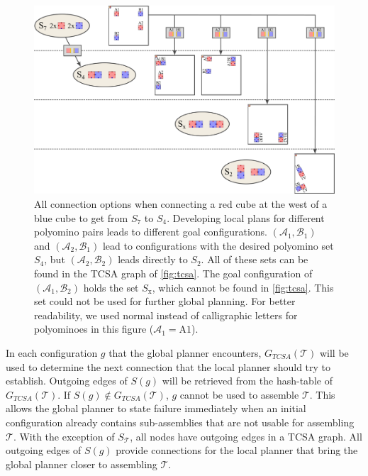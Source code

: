 \begin{figure}
	\centering
	\includegraphics[width=1\textwidth]{figures/connect_options.pdf}
	\caption[Example of connection options for one two-cut-sub-assembly edge]{All connection options when connecting a red cube at the west of a blue cube to get from $S_7$ to $S_4$. Developing local plans for different polyomino pairs leads to different goal configurations. $(\mathcal{A}_1,\mathcal{B}_1)$ and $(\mathcal{A}_2,\mathcal{B}_1)$ lead to configurations with the desired polyomino set $S_4$, but $(\mathcal{A}_2,\mathcal{B}_2)$ leads directly to $S_2$. All of these sets can be found in the TCSA graph of \autoref{fig:tcsa}. The goal configuration of $(\mathcal{A}_1, \mathcal{B}_2)$ holds the set $S_\text{x}$, which cannot be found in \autoref{fig:tcsa}. This set could not be used for further global planning. For better readability, we used normal instead of calligraphic letters for polyominoes in this figure ($\mathcal{A}_1 = \text{A1}$).}
	\label{fig:connect_options}
\end{figure}

In each configuration $g$ that the global planner encounters, $G_{\textit{TCSA}}(\mathcal{T})$ will be used to determine the next connection that the local planner should try to establish.
Outgoing edges of $S(g)$ will be retrieved from the hash-table of $G_{\textit{TCSA}}(\mathcal{T})$.
If $S(g) \notin G_{\textit{TCSA}}(\mathcal{T})$, $g$ cannot be used to assemble $\mathcal{T}$.
This allows the global planner to state failure immediately when an initial configuration already contains sub-assemblies that are not usable for assembling $\mathcal{T}$.
With the exception of $S_\mathcal{T}$, all nodes have outgoing edges in a TCSA graph.
All outgoing edges of $S(g)$ provide connections for the local planner that bring the global planner closer to assembling $\mathcal{T}$.

